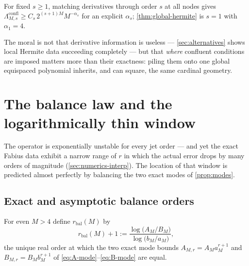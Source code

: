 \begin{conjecture}
\label{conj:higher-hermite}
For fixed $s\ge1$, matching derivatives through order $s$ at all
nodes gives
$\Lambda^{\mathrm{confl}}_{M,s}\ge C_s\,2^{(s+1)M}M^{-\alpha_s}$ for
an explicit $\alpha_s$;
\cref{thm:global-hermite} is $s=1$ with $\alpha_1=4$.
\end{conjecture}

The moral is not that derivative information is useless ---
\cref{sec:alternatives} shows local Hermite data succeeding
completely --- but that \emph{where} confluent conditions are imposed
matters more than their exactness: piling them onto one global
equispaced polynomial inherits, and can square, the same cardinal
geometry.

\section{The balance law and the logarithmically thin window}
\label{sec:balance}

The operator is exponentially unstable for every jet order --- and yet
the exact Fabius data exhibit a narrow range of $r$ in which the
actual error drops by many orders of magnitude
(\cref{sec:numerics-interp}).  The location of that window is
predicted almost perfectly by balancing the two exact modes of
\cref{prop:modes}.

\subsection{Exact and asymptotic balance orders}

\begin{definition}
\label{def:balance}
For even $M>4$ define $r_{\mathrm{bal}}(M)$ by
\begin{equation}
 r_{\mathrm{bal}}(M)+1
 :=\frac{\log\bigl(A_M/B_M\bigr)}{\log\bigl(b_M/a_M\bigr)},
 \label{eq:balance-exact}
\end{equation}
the unique real order at which the two exact mode bounds
$A_{M,r}=A_Ma_M^{r+1}$ and $B_{M,r}=B_Mb_M^{r+1}$ of
\eqref{eq:A-mode}--\eqref{eq:B-mode} are equal.
\end{definition}

